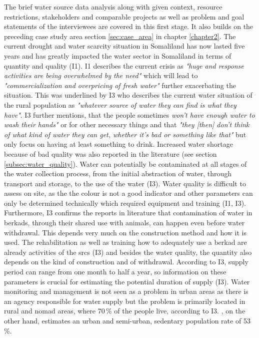 The brief water source data analysis along with given context, resource restrictions, stakeholders and comparable projects as well as problem and goal statements of the interviewees are covered in this first stage. It also builds on the preceding case study area section \ref{sec:case_area} in chapter \ref{chapter2}.\newline
The current drought and water scarcity situation in Somaliland has now lasted five years and has greatly impacted the water sector in Somaliland in terms of quantity and quality (I1). I1 describes the current crisis as \textit{"huge and response activities are being overwhelmed by the need"} which will lead to \textit{"commercialization and overpricing of fresh water"} further exacerbating the situation. This was underlined by I3 who describes the current water situation of the rural population as \textit{"whatever source of water they can find is what they have"}. I3 further mentions, that the people sometimes \textit{won't have enough water to wash their hands"} or for other necessary things and that \textit{"they [then] don't think of what kind of water they can get, whether it's bad or something like that"} but only focus on having at least something to drink. Increased water shortage because of bad quality was also reported in the literature (see section \ref*{subsec:water_quality}). Water can potentially be contaminated at all stages of the water collection process, from the initial abstraction of water, through transport and storage, to the use of the water (I3). Water quality is difficult to assess on site, as the the colour is not a good indicator and other parameters can only be determined technically which required equipment and training (I1, I3). Furthermore, I3 confirms the reports in literature that contamination of water in berkads, through their shared use with animals, can happen even before water withdrawal. This depends very much on the construction method and how it is used. The rehabilitation as well as training how to adequately use a berkad are already activities of the \acrshort*{srcs} (I3) and besides the water quality, the quantity also depends on the kind of construction and of withdrawal. According to I3, supply period can range from one month to half a year, so information on these parameters is crucial for estimating the potential duration of supply (I3).\newline
Water monitoring and management is not seen as a problem in urban areas as there is an agency responsible for water supply but the problem is primarily located in rural and nomad areas, where 70\,\% of the people live, according to I3. \autocite{republicofsomaliaCountryProfile20212021}, on the other hand, estimates an urban and semi-urban, sedentary population rate of 53\,\%.\newline
